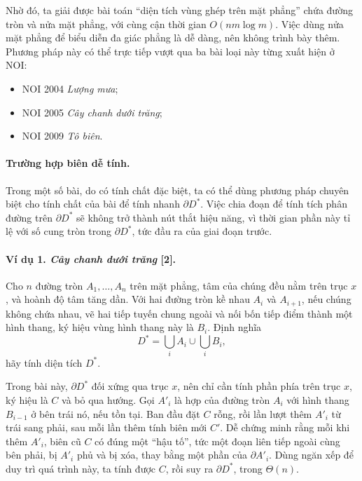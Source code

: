 \documentclass[11pt]{article}
\begin{document}
Nhờ đó, ta giải được bài toán ``diện tích vùng ghép trên mặt phẳng'' chứa
đường tròn và nửa mặt phẳng, với cùng cận thời gian \(O(nm\log m)\). Việc dùng
nửa mặt phẳng để biểu diễn đa giác phẳng là dễ dàng, nên không trình bày thêm.
Phương pháp này có thể trực tiếp vượt qua ba bài loại này từng xuất hiện ở NOI:

\begin{itemize}
  \item NOI 2004 \emph{Lượng mưa};
  \item NOI 2005 \emph{Cây chanh dưới trăng};
  \item NOI 2009 \emph{Tô biên}.
\end{itemize}

\paragraph{Trường hợp biên dễ tính.}
Trong một số bài, do có tính chất đặc biệt, ta có thể dùng phương pháp chuyên
biệt cho tính chất của bài để tính nhanh \(\partial D^*\). Việc chia đoạn để
tính tích phân đường trên \(\partial D^*\) sẽ không trở thành nút thắt hiệu
năng, vì thời gian phần này tỉ lệ với số cung tròn trong \(\partial D^*\), tức
đầu ra của giai đoạn trước.

\paragraph{Ví dụ 1. \emph{Cây chanh dưới trăng} [2].}
Cho \(n\) đường tròn \(A_1,\ldots,A_n\) trên mặt phẳng, tâm của chúng đều nằm
trên trục \(x\), và hoành độ tâm tăng dần. Với hai đường tròn kề nhau \(A_i\)
và \(A_{i+1}\), nếu chúng không chứa nhau, vẽ hai tiếp tuyến chung ngoài và nối
bốn tiếp điểm thành một hình thang, ký hiệu vùng hình thang này là \(B_i\).
Định nghĩa
\[
  D^*=\bigcup_i A_i\cup \bigcup_i B_i,
\]
hãy tính diện tích \(D^*\).

Trong bài này, \(\partial D^*\) đối xứng qua trục \(x\), nên chỉ cần tính phần
phía trên trục \(x\), ký hiệu là \(C\) và bỏ qua hướng. Gọi \(A'_i\) là hợp của
đường tròn \(A_i\) với hình thang \(B_{i-1}\) ở bên trái nó, nếu tồn tại. Ban
đầu đặt \(C\) rỗng, rồi lần lượt thêm \(A'_i\) từ trái sang phải, sau mỗi lần
thêm tính biên mới \(C'\). Dễ chứng minh rằng mỗi khi thêm \(A'_i\), biên cũ
\(C\) có đúng một ``hậu tố'', tức một đoạn liên tiếp ngoài cùng bên phải, bị
\(A'_i\) phủ và bị xóa, thay bằng một phần của \(\partial A'_i\). Dùng ngăn xếp
để duy trì quá trình này, ta tính được \(C\), rồi suy ra \(\partial D^*\), trong
\(\Theta(n)\).
\end{document}
